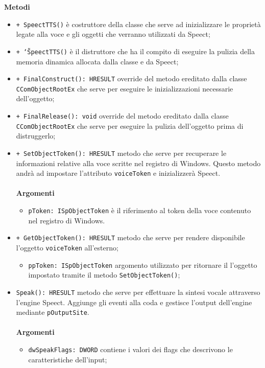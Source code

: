 \textbf{Metodi}
\begin{itemize}
	\item \texttt{+ SpeectTTS()} è costruttore della classe che serve ad inizializzare le proprietà legate alla voce e gli oggetti che verranno utilizzati da Speect;
	\item \texttt{+ \char`\~SpeectTTS()} è il distruttore che ha il compito di eseguire la pulizia della memoria dinamica allocata dalla classe e da Speect; 
	\item \texttt{+ FinalConstruct(): HRESULT} override del metodo ereditato dalla classe \texttt{CComObjectRootEx} che serve per eseguire le inizializzazioni necessarie dell'oggetto;
	\item \texttt{+ FinalRelease(): void} override del metodo ereditato dalla classe\\\texttt{CComObjectRootEx} che serve per eseguire la pulizia dell'oggetto prima di distruggerlo;
	\item \texttt{+ SetObjectToken(): HRESULT} metodo che serve per recuperare le informazioni relative alla voce scritte nel registro di Windows. Questo metodo andrà ad impostare l'attributo \texttt{voiceToken} e inizializzerà Speect.\\\\
	\textbf{Argomenti}
	\begin{itemize}
		\item \texttt{pToken: ISpObjectToken} è il riferimento al token della voce contenuto nel registro di Windows. 
	\end{itemize}
	\item \texttt{+ GetObjectToken(): HRESULT} metodo che serve per rendere disponibile l'oggetto \texttt{voiceToken} all'esterno;
	\begin{itemize}
		\item \texttt{ppToken: ISpObjectToken} argomento utilizzato per ritornare il l'oggetto impostato tramite il metodo \texttt{SetObjectToken()};
	\end{itemize}
	\item \texttt{Speak(): HRESULT} metodo che serve per effettuare la sintesi vocale attraverso l'engine Speect. Aggiunge gli eventi alla coda e gestisce l'output dell'engine mediante \texttt{pOutputSite}.\\\\
	\textbf{Argomenti}
	\begin{itemize}
		\item \texttt{dwSpeakFlags: DWORD} contiene i valori dei flags che descrivono le caratteristiche dell'input;

\end{itemize}
\end{itemize}
